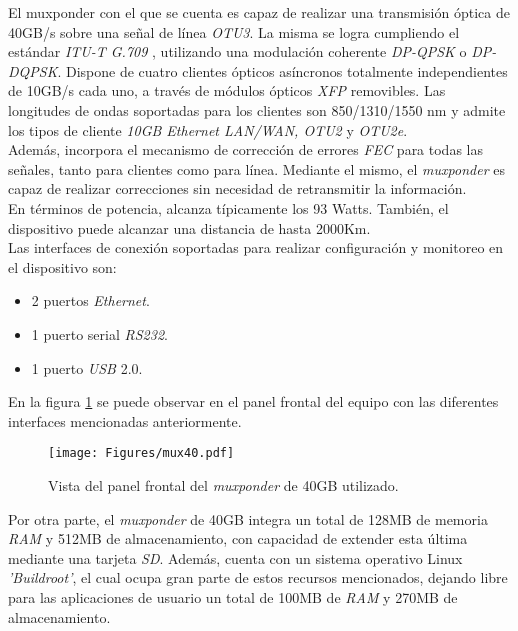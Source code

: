 El muxponder con el que se cuenta es capaz de realizar una transmisión óptica de 40GB/s sobre una señal de línea \textit{OTU3}. La misma se logra cumpliendo el estándar \textit{ITU-T G.709} \parencite{itu7}, utilizando una modulación coherente \textit{DP-QPSK} o \textit{DP-DQPSK}.
Dispone de cuatro clientes ópticos asíncronos totalmente independientes de 10GB/s cada uno, a través de módulos ópticos  \textit{XFP} removibles. Las longitudes de ondas soportadas para los clientes son 850/1310/1550 nm y admite los tipos de cliente \textit{10GB Ethernet LAN/WAN, OTU2} y \textit{OTU2e}.
\\

Además, incorpora el mecanismo de corrección de errores \textit{FEC} para todas las señales, tanto para clientes como para línea. Mediante el mismo, el \textit{muxponder} es capaz de realizar correcciones sin necesidad de retransmitir la información.
\\

En términos de potencia, alcanza típicamente los 93 Watts. También, el dispositivo puede alcanzar una distancia de hasta 2000Km.
\\

Las interfaces de conexión soportadas para realizar configuración y monitoreo en el dispositivo son: 
\begin{itemize}
	\item 2 puertos \textit{Ethernet}.
	\item 1 puerto serial \textit{RS232}.
	\item 1 puerto \textit{USB} 2.0.
\end{itemize}

En la figura \ref{fig:mux40} se puede observar en el panel frontal del equipo con las diferentes interfaces mencionadas anteriormente.


\begin{figure}[H]
	\centering
	\texttt{[image: Figures/mux40.pdf]}
	\caption{Vista del panel frontal del \textit{muxponder} de 40GB utilizado.}
	\label{fig:mux40}
  \end{figure}

  Por otra parte, el \textit{muxponder} de 40GB integra un total de 128MB de memoria \textit{RAM} y 512MB de almacenamiento, con capacidad de extender esta última mediante una tarjeta \textit{SD}. Además, cuenta con un sistema operativo Linux \textit{'Buildroot'}, el cual ocupa gran parte de estos recursos mencionados, dejando libre para las aplicaciones de usuario un total de 100MB de \textit{RAM} y 270MB de almacenamiento.


